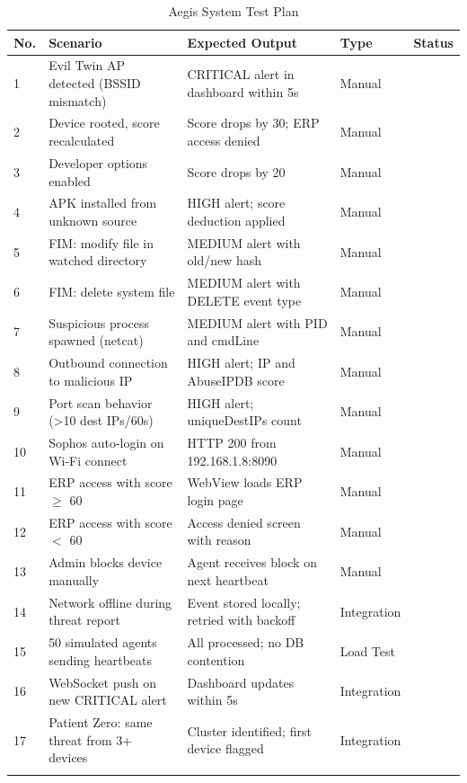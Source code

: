 \documentclass[12pt,a4paper]{report}
\begin{document}
\begin{longtable}{@{}p{0.5cm}p{5cm}p{4.5cm}p{2.5cm}p{1.5cm}@{}}
  \toprule
  \textbf{No.} & \textbf{Scenario} & \textbf{Expected Output} & \textbf{Type} & \textbf{Status} \\
  \midrule
  \endhead
  1  & Evil Twin AP detected (BSSID mismatch)         & CRITICAL alert in dashboard within 5s   & Manual       & \\
  2  & Device rooted, score recalculated               & Score drops by 30; ERP access denied    & Manual       & \\
  3  & Developer options enabled                       & Score drops by 20                       & Manual       & \\
  4  & APK installed from unknown source               & HIGH alert; score deduction applied     & Manual       & \\
  5  & FIM: modify file in watched directory           & MEDIUM alert with old/new hash          & Manual       & \\
  6  & FIM: delete system file                         & MEDIUM alert with DELETE event type     & Manual       & \\
  7  & Suspicious process spawned (netcat)             & MEDIUM alert with PID and cmdLine       & Manual       & \\
  8  & Outbound connection to malicious IP             & HIGH alert; IP and AbuseIPDB score      & Manual       & \\
  9  & Port scan behavior (>10 dest IPs/60s)           & HIGH alert; uniqueDestIPs count         & Manual       & \\
  10 & Sophos auto-login on Wi-Fi connect              & HTTP 200 from 192.168.1.8:8090         & Manual       & \\
  11 & ERP access with score $\geq$ 60                 & WebView loads ERP login page            & Manual       & \\
  12 & ERP access with score $<$ 60                    & Access denied screen with reason        & Manual       & \\
  13 & Admin blocks device manually                    & Agent receives block on next heartbeat  & Manual       & \\
  14 & Network offline during threat report            & Event stored locally; retried with backoff & Integration & \\
  15 & 50 simulated agents sending heartbeats          & All processed; no DB contention         & Load Test    & \\
  16 & WebSocket push on new CRITICAL alert            & Dashboard updates within 5s             & Integration  & \\
  17 & Patient Zero: same threat from 3+ devices       & Cluster identified; first device flagged & Integration & \\
  \bottomrule
  \caption{Aegis System Test Plan}
\end{longtable}
\end{document}
